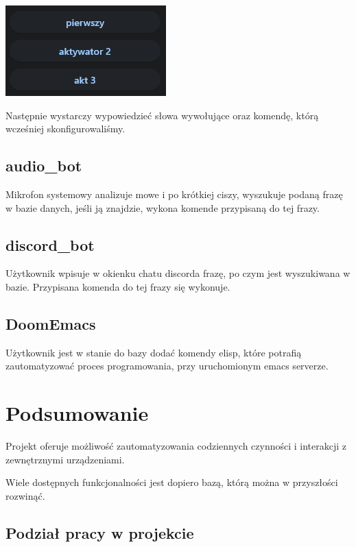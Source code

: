 \documentclass[polish]{article}
\begin{document}
        \begin{center}

          \includegraphics[scale=1.0]{screen5.png}

        \end{center}

        Następnie wystarczy wypowiedzieć słowa wywołujące oraz komendę, którą wcześniej skonfigurowaliśmy.

		\subsection{audio\_bot}
		
		Mikrofon systemowy analizuje mowe i po krótkiej ciszy, wyszukuje podaną frazę w bazie danych, jeśli ją znajdzie, wykona komende przypisaną do tej frazy.
		
		\subsection{discord\_bot}
		
		Użytkownik wpisuje w okienku chatu discorda frazę, po czym jest wyszukiwana w bazie. Przypisana komenda do tej frazy się wykonuje.
		
		\subsection{DoomEmacs}
		
		Użytkownik jest w stanie do bazy dodać komendy elisp, które potrafią zautomatyzować proces programowania, przy uruchomionym emacs serverze.
		
    \section{Podsumowanie}

		Projekt oferuje możliwość zautomatyzowania codziennych czynności i interakcji z zewnętrznymi urządzeniami. 
		
		Wiele dostępnych funkcjonalności jest dopiero bazą, którą można w przyszłości rozwinąć. 
		
        \subsection{Podział pracy w projekcie}
\end{document}
